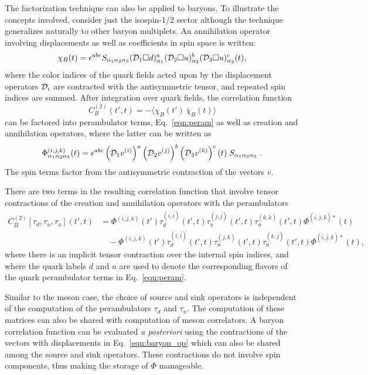 The factorization technique can also be applied to baryons.
To illustrate the concepts involved, consider just the isospin-1/2 sector
although the technique generalizes naturally to other baryon multiplets.
An annihilation operator involving displacements
as well as coefficients in spin space is written:
\begin{equation}
\chi_B(t) = \epsilon^{abc} S_{\alpha_1\alpha_2\alpha_3}
({\cal D}_1\Box d)^a_{\alpha_1}
({\cal D}_2\Box u)^b_{\alpha_2}
({\cal D}_3\Box u)^c_{\alpha_3}(t),
\end{equation}
where the color indices of the quark fields acted upon
by the displacement operators ${\cal D}_i$ are contracted with the
antisymmetric tensor, and repeated spin indices are summed.
After integration over quark fields, the correlation function
\begin{equation}
   C^{(2)}_B(t',t) = -\Big\langle \chi_B(t') \, \bar{\chi}_B(t)\Big\rangle
\end{equation}
can be factored into perambulator terms, Eq.~\ref{eqn:peram}
as well as creation and annihilation operators, where the latter can be
written as
\begin{equation}
 \Phi^{(i,j,k)}_{\alpha_1\alpha_2\alpha_3}(t) = \epsilon^{abc}
\left({\cal D}_1 v^{(i)}\right)^{a}
\left({\cal D}_2 v^{(j)}\right)^{b}
\left({\cal D}_3 v^{(k)}\right)^{c}(t)\;
S_{\alpha_1\alpha_2\alpha_3}\ .
\label{eqn:baryon_op}
\end{equation}
The spin terms factor from the antisymmetric contraction of the vectors
$v$.

There are two terms in the resulting correlation function
that involve tensor contractions of the creation and annihilation operators
with the perambulators
\begin{align}
C^{(2)}_B[\tau_d,\tau_u,\tau_u](t',t) &=
  \Phi^{(i,j,k)}(t')
  \tau_d^{(i,\bar{i})}(t',t)
  \tau_u^{(j,\bar{j})}(t',t)
  \tau_u^{(k,\bar{k})}(t',t)
  \Phi^{(\bar{i},\bar{j},\bar{k})*}(t)
  \nonumber\\
 &\quad- \Phi^{(i,j,k)}(t')
  \tau_d^{(i,\bar{i})}(t',t)
  \tau_u^{(j,\bar{k})}(t',t)
  \tau_u^{(k,\bar{j})}(t',t)
  \Phi^{(\bar{i},\bar{j},\bar{k})*}(t),
\end{align}
where there is an implicit tensor contraction over the internal spin
indices, and where the quark labels $d$ and $u$ are used to denote
the corresponding flavors of the quark perambulator terms in
Eq.~\ref{eqn:peram}.

Similar to the meson case, the choice of source and sink operators is
independent of the computation of the perambulators $\tau_d$ and $\tau_u$.
The computation of these matrices can also be shared with computation of meson
correlators.  A baryon correlation function can be evaluated {\em a posteriori}
using the contractions of the vectors with displacements in
Eq.~\ref{eqn:baryon_op} which can also be shared among the source and sink
operators. These contractions do not involve spin components, thus making the
storage of $\Phi$ manageable.

